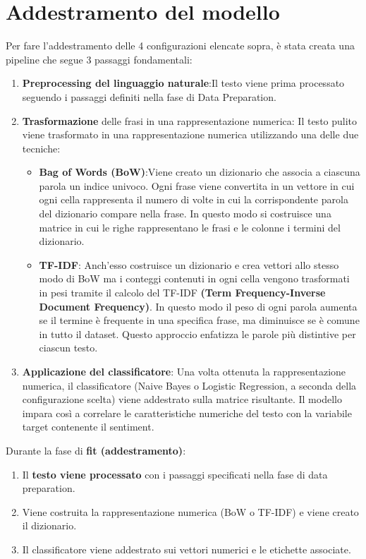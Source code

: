 \documentclass[12pt,a4paper]{report} %
\begin{document}
\section{Addestramento del modello}
Per fare l'addestramento delle 4 configurazioni elencate sopra, è stata creata una pipeline che segue 3 passaggi fondamentali:
\begin{enumerate}
    \item \textbf{Preprocessing del linguaggio naturale}:Il testo viene prima processato seguendo i passaggi definiti nella fase di Data Preparation.
    \item \textbf{Trasformazione} delle frasi in una rappresentazione numerica: Il testo pulito viene trasformato in una rappresentazione numerica utilizzando una delle due tecniche: 
    \begin{itemize}
        \item \textbf{Bag of Words (BoW)}:Viene creato un dizionario che associa a ciascuna parola un indice univoco. Ogni frase viene convertita in un vettore in cui ogni cella rappresenta il numero di volte in cui la corrispondente parola del dizionario compare nella frase. In questo modo si costruisce una matrice in cui le righe rappresentano le frasi e le colonne i termini del dizionario. 
        \item \textbf{TF-IDF}: Anch'esso costruisce un dizionario e crea vettori allo stesso modo di BoW ma i conteggi contenuti in ogni cella vengono trasformati in pesi tramite il calcolo del TF-IDF \textbf{(Term Frequency-Inverse Document Frequency)}. In questo modo il peso di ogni parola aumenta se il termine è frequente in una specifica frase, ma diminuisce se è comune in tutto il dataset. Questo approccio enfatizza le parole più distintive per ciascun testo. 
    \end{itemize}
    \item \textbf{Applicazione del classificatore}: Una volta ottenuta la rappresentazione numerica, il classificatore (Naive Bayes o Logistic Regression, a seconda della configurazione scelta) viene addestrato sulla matrice risultante. Il modello impara così a correlare le caratteristiche numeriche del testo con la variabile target contenente il sentiment. 
\end{enumerate}
Durante la fase di \textbf{fit (addestramento)}:
\begin{enumerate}
    \item Il \textbf{testo viene processato} con i passaggi specificati nella fase di data preparation.
    \item Viene costruita la rappresentazione numerica (BoW o TF-IDF) e viene creato il dizionario. 
    \item Il classificatore viene addestrato sui vettori numerici e le etichette associate. 
\end{enumerate}
\end{document}
